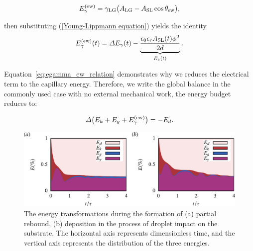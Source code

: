 \documentclass[lineno]{cls/jfm}
\begin{document}
\begin{equation}
  E_\gamma^{\rm (ew)} = \gamma_{\rm LG}\big( A_{\rm LG} - A_{\rm SL}\cos\theta_{\rm ew}\big),
\end{equation}

\noindent then substituting (\ref{Young-Lippmann equation}) yields the identity
\begin{equation}
  E_\gamma^{\rm (ew)}(t) = \Delta E_\gamma(t) - \underbrace{\frac{\epsilon_0\epsilon_r A_{\rm SL}(t)\phi^2}{2d}}_{E_e(t)}.
  \label{eq:egamma_ew_relation}
\end{equation}

\noindent Equation~\eqref{eq:egamma_ew_relation} demonstrates why we reduces the electrical term to the capillary energy. Therefore, we write the global balance in the commonly used case with no external mechanical work, the energy budget reduces to:

\begin{equation}
  \Delta\big( E_k + E_g + E_\gamma^{\rm (ew)}\big) = -E_d.
  \label{eq:global energy}
\end{equation}


 \begin{figure}
  \centerline{\includegraphics[width=1.0\textwidth]{fig/dropET.pdf}}
  \caption{The energy transformations during the formation of (a) partial rebound, (b) deposition in the process of droplet impact on the substrate. The horizontal axis represents dimensionless time, and the vertical axis represents the distribution of the three energies.}
 \label{fig:energy}
 \end{figure}
\end{document}
